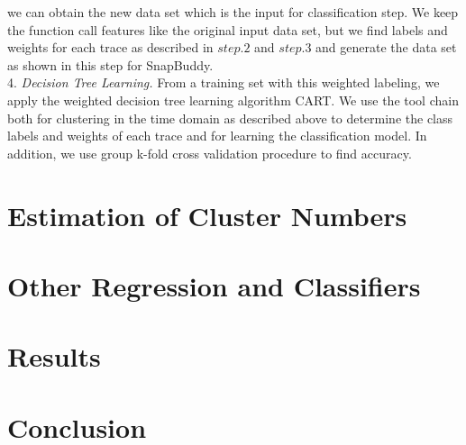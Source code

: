 \documentclass{article}
\begin{document}
we can obtain the new data set which is the input for classification step. 
We keep the function call features like the original input data set, but we
find labels and weights for each trace as described in $step.2$ and $step.3$
and generate the data set as shown in this step for SnapBuddy. \\
4. \smallskip\textit{Decision Tree Learning.}
From a training set with this weighted labeling, we apply the weighted
decision tree learning algorithm CART.
We use the tool chain both for clustering in the time domain as described
above to determine the class labels and weights of each trace and for
learning the classification model. In addition, we use group k-fold cross
validation procedure to find accuracy. 

\section{Estimation of Cluster Numbers}

\section{Other Regression and Classifiers}

\section{Results}


\section{Conclusion}
\end{document}
